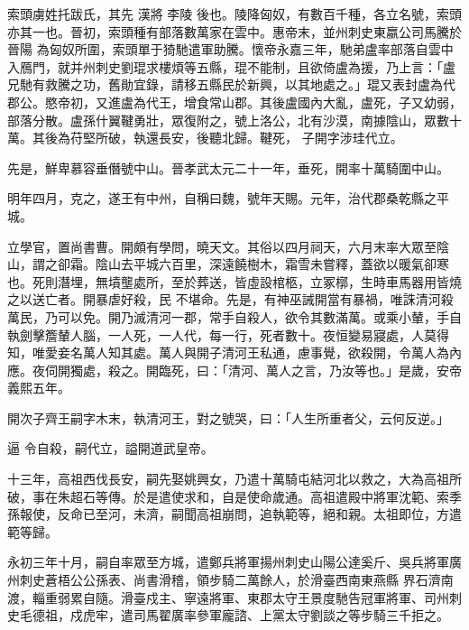 
\begin{pinyinscope}

 索頭虜姓托跋氏，其先
 漢將
 李陵
 後也。陵降匈奴，有數百千種，各立名號，索頭亦其一也。晉初，索頭種有部落數萬家在雲中。惠帝末，並州刺史東嬴公司馬騰於晉陽
 為匈奴所圍，索頭單于猗馳遣軍助騰。懷帝永嘉三年，馳弟盧率部落自雲中入鴈門，就并州刺史劉琨求樓煩等五縣，琨不能制，且欲倚盧為援，乃上言：「盧兄馳有救騰之功，舊勛宜錄，請移五縣民於新興，以其地處之。」琨又表封盧為代郡公。愍帝初，又進盧為代王，增食常山郡。其後盧國內大亂，盧死，子又幼弱，部落分散。盧孫什翼鞬勇壯，眾復附之，號上洛公，北有沙漠，南據陰山，眾數十萬。其後為苻堅所破，執還長安，後聽北歸。鞬死，
 子開字涉珪代立。



 先是，鮮卑慕容垂僭號中山。晉孝武太元二十一年，垂死，開率十萬騎圍中山。



 明年四月，克之，遂王有中州，自稱曰魏，號年天賜。元年，治代郡桑乾縣之平城。



 立學官，置尚書曹。開頗有學問，曉天文。其俗以四月祠天，六月末率大眾至陰山，謂之卻霜。陰山去平城六百里，深遠饒樹木，霜雪未嘗釋，蓋欲以暖氣卻寒也。死則潛埋，無墳壟處所，至於葬送，皆虛設棺柩，立冢槨，生時車馬器用皆燒之以送亡者。開暴虐好殺，民
 不堪命。先是，有神巫誡開當有暴禍，唯誅清河殺萬民，乃可以免。開乃滅清河一郡，常手自殺人，欲令其數滿萬。或乘小輦，手自執劍擊簷輦人腦，一人死，一人代，每一行，死者數十。夜恒變易寢處，人莫得知，唯愛妾名萬人知其處。萬人與開子清河王私通，慮事覺，欲殺開，令萬人為內應。夜伺開獨處，殺之。開臨死，曰：「清河、萬人之言，乃汝等也。」是歲，安帝義熙五年。



 開次子齊王嗣字木末，執清河王，對之號哭，曰：「人生所重者父，云何反逆。」



 逼
 令自殺，嗣代立，謚開道武皇帝。



 十三年，高祖西伐長安，嗣先娶姚興女，乃遣十萬騎屯結河北以救之，大為高祖所破，事在朱超石等傳。於是遣使求和，自是使命歲通。高祖遣殿中將軍沈範、索季孫報使，反命已至河，未濟，嗣聞高祖崩問，追執範等，絕和親。太祖即位，方遣範等歸。



 永初三年十月，嗣自率眾至方城，遣鄭兵將軍揚州刺史山陽公達奚斤、吳兵將軍廣州刺史蒼梧公公孫表、尚書滑稽，領步騎二萬餘人，於滑臺西南東燕縣
 界石濟南渡，輜重弱累自隨。滑臺戍主、寧遠將軍、東郡太守王景度馳告冠軍將軍、司州刺史毛德祖，戍虎牢，遣司馬翟廣率參軍龐諮、上黨太守劉談之等步騎三千拒之。




\end{pinyinscope}
